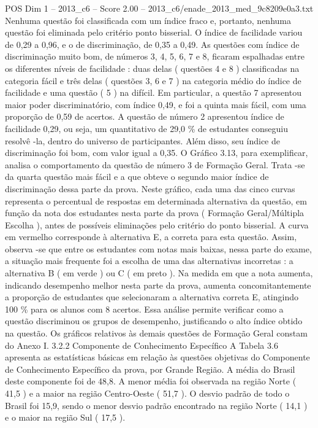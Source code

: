 \begin{textsample}{POS Dim 1 – 2013\_c6 – Score 2.00 – 2013\_c6/enade\_2013\_med\_9c8209e0a3.txt}
Nenhuma questão foi classificada com um índice fraco e, portanto, nenhuma questão foi eliminada pelo critério ponto bisserial.
O índice de facilidade variou de 0,29 a 0,96, e o de discriminação, de 0,35 a 0,49.
As questões com índice de discriminação muito bom, de números 3, 4, 5, 6, 7 e 8, ficaram espalhadas entre os diferentes níveis de facilidade : duas delas ( questões 4 e 8 ) classificadas na categoria fácil e três delas ( questões 3, 6 e 7 ) na categoria médio do índice de facilidade e uma questão ( 5 ) na difícil.
Em particular, a questão 7 apresentou maior poder discriminatório, com índice 0,49, e foi a quinta mais fácil, com uma proporção de 0,59 de acertos.
A questão de número 2 apresentou índice de facilidade 0,29, ou seja, um quantitativo de 29,0 \% de estudantes conseguiu resolvê -la, dentro do universo de participantes.
Além disso, seu índice de discriminação foi bom, com valor igual a 0,35.
O Gráfico 3.13, para exemplificar, analisa o comportamento da questão de número 3 de Formação Geral.
Trata -se da quarta questão mais fácil e a que obteve o segundo maior índice de discriminação dessa parte da prova.
Neste gráfico, cada uma das cinco curvas representa o percentual de respostas em determinada alternativa da questão, em função da nota dos estudantes nesta parte da prova ( Formação Geral/Múltipla Escolha ), antes de possíveis eliminações pelo critério do ponto bisserial.
A curva em vermelho corresponde à alternativa E, a correta para esta questão.
Assim, observa -se que entre os estudantes com notas mais baixas, nessa parte do exame, a situação mais frequente foi a escolha de uma das alternativas incorretas : a alternativa B ( em verde ) ou C ( em preto ).
Na medida em que a nota aumenta, indicando desempenho melhor nesta parte da prova, aumenta concomitantemente a proporção de estudantes que selecionaram a alternativa correta E, atingindo 100 \% para os alunos com 8 acertos.
Essa análise permite verificar como a questão discriminou os grupos de desempenho, justificando o alto índice obtido na questão.
Os gráficos relativos às demais questões de Formação Geral constam do Anexo I. 3.2.2 Componente de Conhecimento Específico A Tabela 3.6 apresenta as estatísticas básicas em relação às questões objetivas do Componente de Conhecimento Específico da prova, por Grande Região.
A média do Brasil deste componente foi de 48,8.
A menor média foi observada na região Norte ( 41,5 ) e a maior na região Centro-Oeste ( 51,7 ).
O desvio padrão de todo o Brasil foi 15,9, sendo o menor desvio padrão encontrado na região Norte ( 14,1 ) e o maior na região Sul ( 17,5 ).

\end{textsample}
